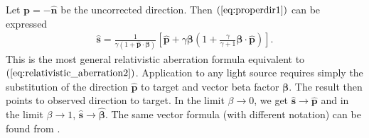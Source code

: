 \documentclass [12pt, a4paper] {article}
\newcommand{\vu}[1]
{
	\mathbf{\hat #1}
}
\newcommand{\vc}[1]
{
	\boldsymbol{#1}
}
\begin{document}
Let $\vc p = -\vu n$ be the uncorrected direction. Then $(\ref{eq:properdir1})$ can 
be expressed 
\begin {eqnarray}
    \boxed{
        \quad
        \label{eq:properdir2}
        \vu s 
        =
        \frac{1}{\gamma(1 + \vu p\cdot\vc\beta)}
        \left[
            \vu p 
            + 
            \gamma\vc\beta 
            \left(
                1 + \frac{\gamma}{\gamma + 1}\vc\beta\cdot\vu p
            \right)
        \right].    
        \quad
    }
\end {eqnarray}
This is the most general relativistic aberration formula equivalent to 
$(\ref{eq:relativistic_aberration2})$. Application to any light source requires simply 
the substitution of the direction $\vu p$ to target and vector beta factor $\vc\beta$.
The result then points to observed direction to target. In the limit $\beta\to 0$, we get 
$\vu s\to\vu p$ and in the limit $\beta\to 1$, $\vu s\to\vu\beta$. The same vector 
formula (with different notation) can be found from \cite{almanac}.
\end{document}
